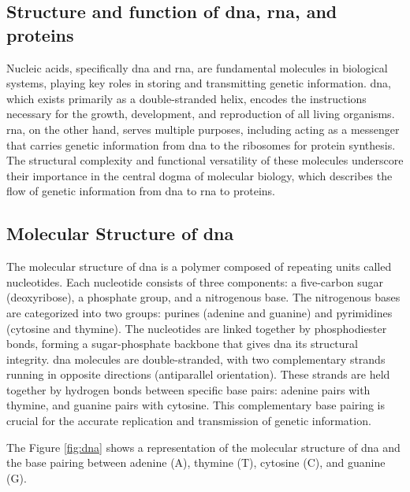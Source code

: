 \subsection{Structure and function of \acs{dna}, \acs{rna}, and proteins} \label{subsec:genetics_structure}

Nucleic acids, specifically  \ac{dna} and \ac{rna}, are fundamental molecules in biological systems, playing key roles in storing and transmitting genetic information. \ac{dna}, which exists primarily as a double-stranded helix, encodes the instructions necessary for the growth, development, and reproduction of all living organisms. \ac{rna}, on the other hand, serves multiple purposes, including acting as a messenger that carries genetic information from \ac{dna} to the ribosomes for protein synthesis. The structural complexity and functional versatility of these molecules underscore their importance in the central dogma of molecular biology, which describes the flow of genetic information from \ac{dna} to \ac{rna} to proteins. \cite{Minchin2019}

\subsection{Molecular Structure of \acs{dna}} \label{subsec:genetics_molecular}

The molecular structure of \ac{dna} is a polymer composed of repeating units called nucleotides. Each nucleotide consists of three components: a five-carbon sugar (deoxyribose), a phosphate group, and a nitrogenous base. The nitrogenous bases are categorized into two groups: purines (adenine and guanine) and pyrimidines (cytosine and thymine). The nucleotides are linked together by phosphodiester bonds, forming a sugar-phosphate backbone that gives \ac{dna} its structural integrity. \ac{dna} molecules are double-stranded, with two complementary strands running in opposite directions (antiparallel orientation). These strands are held together by hydrogen bonds between specific base pairs: adenine pairs with thymine, and guanine pairs with cytosine. This complementary base pairing is crucial for the accurate replication and transmission of genetic information. \cite{Minchin2019}

The Figure \ref{fig:dna} shows a representation of the molecular structure of \ac{dna} and the base pairing between adenine (A), thymine (T), cytosine (C), and guanine (G).

